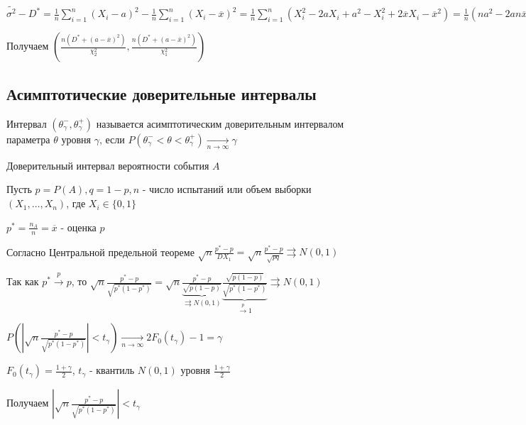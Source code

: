 \documentclass[12pt]{article}
\begin{document}
\begin{enumerate}[label*=\Roman*.]
    \Nota $\tilde{\sigma^2} - D^* = \frac{1}{n} \sum_{i = 1}^n (X_i - a)^2 - \frac{1}{n} \sum_{i = 1}^n (X_i - \overline{x})^2 = 
    \frac{1}{n} \sum_{i = 1}^n (X_i^2 - 2aX_i + a^2 - X_i^2 + 2 \overline{x} X_i - \overline{x}^2) = 
    \frac{1}{n} (na^2 - 2a n \overline{x} + 2 \overline{x} \cdot n \overline{x} - n \overline{x}^2) = 
    a^2 - 2a \overline{x} + \overline{x}^2 = (a - \overline{x})^2 \Longrightarrow \tilde{\sigma^2} = D^* + (a - \overline{x})^2$

    Получаем $\left(\frac{n (D^* + (a - \overline{x})^2)}{\chi_2^2}, \frac{n (D^* + (a - \overline{x})^2)}{\chi_1^2}\right)$

\end{enumerate}

\subsection{Асимптотические доверительные интервалы}

\Def Интервал $(\theta^-_\gamma, \theta^+_\gamma)$ называется асимптотическим доверительным интервалом параметра $\theta$ 
уровня $\gamma$, если $P(\theta^-_\gamma < \theta < \theta^+_\gamma) \underset{n \to \infty}{\longrightarrow} \gamma$

\Ex Доверительный интервал вероятности события $A$

Пусть $p = P(A), q = 1 - p, n$ - число испытаний или объем выборки $(X_1, \dots, X_n)$, где $X_i \in \{0, 1\}$

$p^* = \frac{n_A}{n} = \overline{x}$ - оценка $p$

Согласно Центральной предельной теореме $\sqrt{n} \frac{p^* - p}{D X_1} = \sqrt{n} \frac{p^* - p}{\sqrt{pq}} \rightrightarrows N(0, 1)$

Так как $p^* \overset{p}{\longrightarrow} p$, то $\sqrt{n} \frac{p^* - p}{\sqrt{p^* (1 - p^*)}} = 
\sqrt{n} \underset{\rightrightarrows N(0, 1)}{\underbrace{\frac{p^* - p}{\sqrt{p (1 - p)}}}} \underset{\overset{p}{\longrightarrow} 1}{\underbrace{\frac{\sqrt{p (1 - p)}}{\sqrt{p^* (1 - p^*)}}}} \rightrightarrows N(0, 1)$


$P\left(\left|\sqrt{n} \frac{p^* - p}{\sqrt{p^* (1 - p^*)}}\right| < t_\gamma\right) \underset{n \to \infty}{\longrightarrow} 2F_0(t_\gamma) - 1 = \gamma$

$F_0(t_\gamma) = \frac{1 + \gamma}{2}$, $t_\gamma$ - квантиль $N(0, 1)$ уровня $\frac{1 + \gamma}{2}$

Получаем $\left|\sqrt{n} \frac{p^* - p}{\sqrt{p^* (1 - p^*)}}\right| < t_\gamma$
\end{document}
